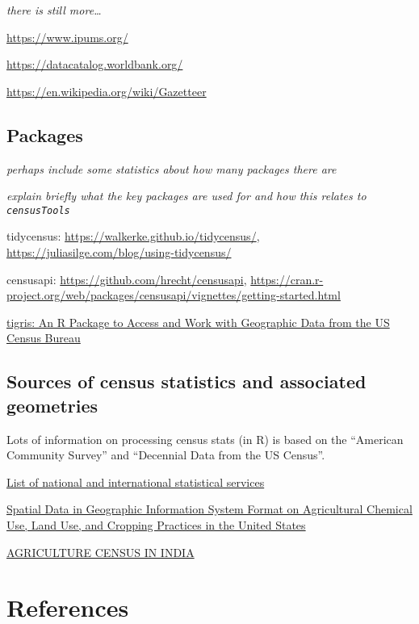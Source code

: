 \documentclass[12pt,]{article}
\begin{document}
\emph{there is still more\ldots{}}

\url{https://www.ipums.org/}

\url{https://datacatalog.worldbank.org/}

\url{https://en.wikipedia.org/wiki/Gazetteer}

\hypertarget{packages}{%
\subsection{Packages}\label{packages}}

\emph{perhaps include some statistics about how many packages there are}

\emph{explain briefly what the key packages are used for and how this relates to \texttt{censusTools}}

tidycensus: \url{https://walkerke.github.io/tidycensus/}, \url{https://juliasilge.com/blog/using-tidycensus/}

censusapi: \url{https://github.com/hrecht/censusapi}, \url{https://cran.r-project.org/web/packages/censusapi/vignettes/getting-started.html}

\href{https://journal.r-project.org/archive/2016/RJ-2016-043/RJ-2016-043.pdf}{tigris: An R Package to Access and Work with Geographic Data from the US Census Bureau}

\hypertarget{sources-of-census-statistics-and-associated-geometries}{%
\subsection{Sources of census statistics and associated geometries}\label{sources-of-census-statistics-and-associated-geometries}}

Lots of information on processing census stats (in R) is based on the ``American Community Survey'' and ``Decennial Data from the US Census''.

\href{https://en.wikipedia.org/wiki/List_of_national_and_international_statistical_services}{List of national and international statistical services}

\href{https://pubs.usgs.gov/wri/wri944176/}{Spatial Data in Geographic Information System Format on Agricultural Chemical Use, Land Use, and Cropping Practices in the United States}

\href{http://iasri.res.in/ebook/TEFCPI_sampling/AGRICULTURE\%20CENSUS\%20IN\%20INDIA.pdf}{AGRICULTURE CENSUS IN INDIA}

\hypertarget{references}{%
\section*{References}\label{references}}
\end{document}
